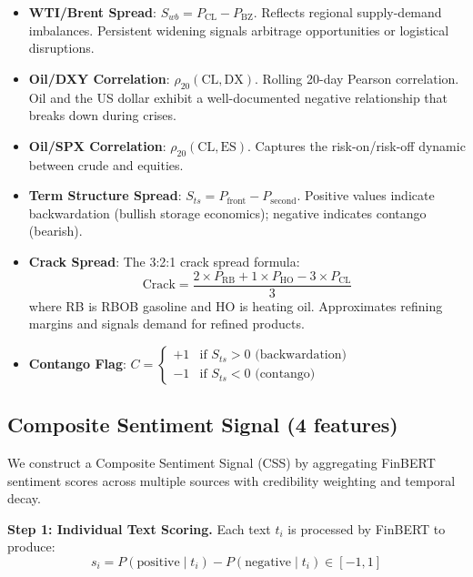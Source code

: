 \documentclass[12pt,a4paper]{article}
\begin{document}
\begin{itemize}[leftmargin=*]
    \item \textbf{WTI/Brent Spread}: $S_{wb} = P_{\text{CL}} - P_{\text{BZ}}$. Reflects regional supply-demand imbalances. Persistent widening signals arbitrage opportunities or logistical disruptions.

    \item \textbf{Oil/DXY Correlation}: $\rho_{20}(\text{CL}, \text{DX})$. Rolling 20-day Pearson correlation. Oil and the US dollar exhibit a well-documented negative relationship that breaks down during crises.

    \item \textbf{Oil/SPX Correlation}: $\rho_{20}(\text{CL}, \text{ES})$. Captures the risk-on/risk-off dynamic between crude and equities.

    \item \textbf{Term Structure Spread}: $S_{ts} = P_{\text{front}} - P_{\text{second}}$. Positive values indicate backwardation (bullish storage economics); negative indicates contango (bearish).

    \item \textbf{Crack Spread}: The 3:2:1 crack spread formula:
    \begin{equation}
        \text{Crack} = \frac{2 \times P_{\text{RB}} + 1 \times P_{\text{HO}} - 3 \times P_{\text{CL}}}{3}
    \end{equation}
    where RB is RBOB gasoline and HO is heating oil. Approximates refining margins and signals demand for refined products.

    \item \textbf{Contango Flag}: $C = \begin{cases} +1 & \text{if } S_{ts} > 0 \text{ (backwardation)} \\ -1 & \text{if } S_{ts} < 0 \text{ (contango)} \end{cases}$
\end{itemize}

\subsection{Composite Sentiment Signal (4 features)}
\label{sec:features:sentiment}

We construct a Composite Sentiment Signal (CSS) by aggregating FinBERT \citep{araci2019finbert} sentiment scores across multiple sources with credibility weighting and temporal decay.

\textbf{Step 1: Individual Text Scoring.} Each text $t_i$ is processed by FinBERT to produce:
\begin{equation}
    s_i = P(\text{positive} \mid t_i) - P(\text{negative} \mid t_i) \in [-1, 1]
\end{equation}
\end{document}
